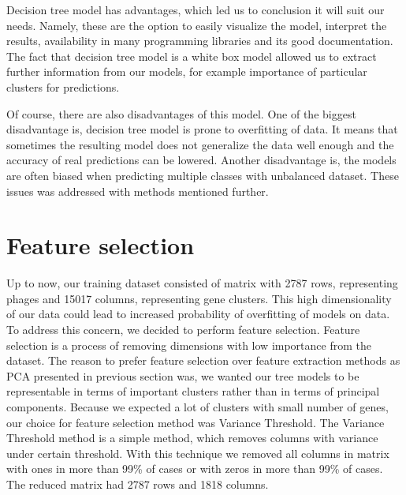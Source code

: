 Decision tree model has advantages, which led us to conclusion it will suit our needs.
Namely, these are the option to easily visualize the model, interpret the results, availability in many programming libraries and its good documentation.
The fact that decision tree model is a white box model allowed us to extract further information from our models, for example importance of particular clusters for predictions.

Of course, there are also disadvantages of this model.
One of the biggest disadvantage is, decision tree model is prone to overfitting of data.
It means that sometimes the resulting model does not generalize the data well enough and the accuracy of real predictions can be lowered.
Another disadvantage is, the models are often biased when predicting multiple classes with unbalanced dataset.
These issues was addressed with methods mentioned further.

\section{Feature selection}
Up to now, our training dataset consisted of matrix with 2787 rows, representing phages and 15017 columns, representing gene clusters.
This high dimensionality of our data could lead to increased probability of overfitting of models on data.
To address this concern, we decided to perform feature selection.
Feature selection is a process of removing dimensions with low importance from the dataset.
The reason to prefer feature selection over feature extraction methods as PCA presented in previous section was, we wanted our tree models to be representable in terms of important clusters rather than in terms of principal components.
Because we expected a lot of clusters with small number of genes, our choice for feature selection method was Variance Threshold.
The Variance Threshold method is a simple method, which removes columns with variance under certain threshold.
With this technique we removed all columns in matrix with ones in more than 99\% of cases or with zeros in more than 99\% of cases.
The reduced matrix had 2787 rows and 1818 columns.

